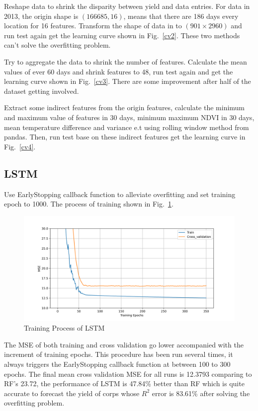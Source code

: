 \documentclass[conference]{IEEEtran}
\begin{document}
Reshape data to shrink the disparity between yield and data entries. For data in 2013, the origin shape is $(166685,16)$, means that there are 186 days every location for 16 features. Transform the shape of data in to $(901\times2960)$ and run test again get the learning curve shown in Fig.~\ref{cv2}. These two methods can't solve the overfitting problem.

Try to aggregate the data to shrink the number of features. Calculate the mean values of ever 60 days and shrink features to 48, run test again and get the learning curve shown in Fig.~\ref{cv3}. There are some improvement after half of the dataset getting involved.

Extract some indirect features from the origin features, calculate the minimum and maximum value of features in 30 days, minimum maximum NDVI in 30 days, mean temperature difference and variance e.t using rolling window method from pandas. Then, run test base on these indirect features get the learning curve in Fig.~\ref{cv4}.

\subsection{LSTM}
Use EarlyStopping callback function to alleviate overfitting and set training epoch to 1000. The process of training shown in Fig.~\ref{fig:train}.

\begin{figure}[htbp]
  \centerline{\includegraphics[width=\linewidth]{figures/lp.png}}
  \caption{Training Process of LSTM}
  \label{fig:train}
\end{figure}

The MSE of both training and cross validation go lower accompanied with the increment of training epochs. This procedure has been run several times, it always triggers the EarlyStopping callback function at between 100 to 300 epochs. The final mean cross validation MSE for all runs is 12.3793 comparing to RF's 23.72, the performance of LSTM is 47.84\% better than RF which is quite accurate to forecast the yield of corps whose $R^2$ error is 83.61\% after solving the overfitting problem.
\end{document}

